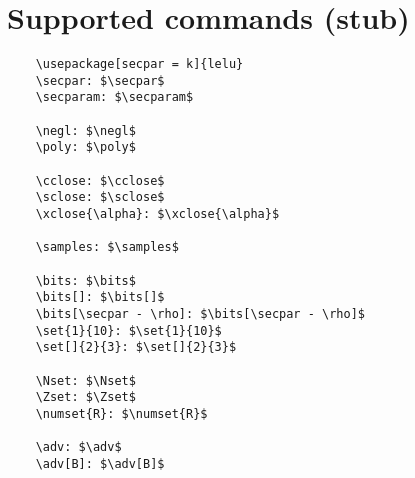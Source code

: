 \documentclass{article}
\begin{document}
\section{Supported commands (stub)}

\begin{lstlisting}
    \usepackage[secpar = k]{lelu}
    \secpar: $\secpar$
    \secparam: $\secparam$

    \negl: $\negl$
    \poly: $\poly$

    \cclose: $\cclose$
    \sclose: $\sclose$
    \xclose{\alpha}: $\xclose{\alpha}$ 

    \samples: $\samples$

    \bits: $\bits$
    \bits[]: $\bits[]$
    \bits[\secpar - \rho]: $\bits[\secpar - \rho]$
    \set{1}{10}: $\set{1}{10}$
    \set[]{2}{3}: $\set[]{2}{3}$

    \Nset: $\Nset$
    \Zset: $\Zset$
    \numset{R}: $\numset{R}$

    \adv: $\adv$
    \adv[B]: $\adv[B]$
\end{lstlisting}
    
\end{document}
